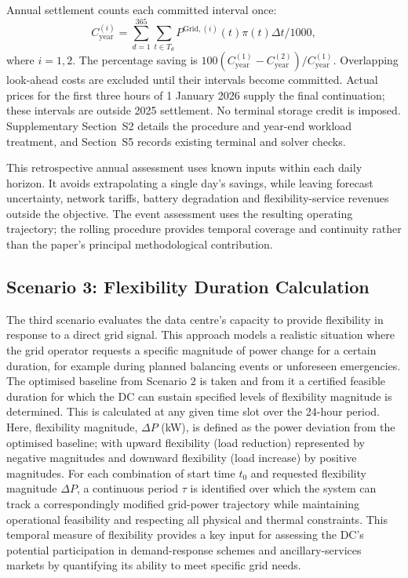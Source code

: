 \documentclass[lettersize,journal]{IEEEtran}
\begin{document}
Annual settlement counts each committed interval once:
\begin{equation}
C^{(i)}_{\mathrm{year}}=\sum_{d=1}^{365}\sum_{t\in T_d}P^{\mathrm{Grid},(i)}(t)\pi(t)\Delta t/1000,
\label{eq:annual-cost}
\end{equation}
where $i=1,2$. The percentage saving is $100(C^{(1)}_{\mathrm{year}}-C^{(2)}_{\mathrm{year}})/C^{(1)}_{\mathrm{year}}$. Overlapping look-ahead costs are excluded until their intervals become committed. Actual prices for the first three hours of 1 January 2026 supply the final continuation; these intervals are outside 2025 settlement. No terminal storage credit is imposed. Supplementary Section~S2 details the procedure and year-end workload treatment, and Section~S5 records existing terminal and solver checks.

This retrospective annual assessment uses known inputs within each daily horizon. It avoids extrapolating a single day's savings, while leaving forecast uncertainty, network tariffs, battery degradation and flexibility-service revenues outside the objective. The event assessment uses the resulting operating trajectory; the rolling procedure provides temporal coverage and continuity rather than the paper's principal methodological contribution.


\subsection{Scenario 3: Flexibility Duration Calculation}\label{sec:scenario 3}
The third scenario evaluates the data centre's capacity to provide flexibility in response to a direct grid signal. This approach models a realistic situation where the grid operator requests a specific magnitude of power change for a certain duration, for example during planned balancing events or unforeseen emergencies. The optimised baseline from Scenario 2 is taken and from it a certified feasible duration for which the DC can sustain specified levels of flexibility magnitude is determined. This is calculated at any given time slot over the 24-hour period. Here, flexibility magnitude, $\Delta P$ (kW), is defined as the power deviation from the optimised baseline; with upward flexibility (load reduction) represented by negative magnitudes and downward flexibility (load increase) by positive magnitudes. For each combination of start time $t_0$ and requested flexibility magnitude $\Delta P$, a continuous period $\tau$ is identified over which the system can track a correspondingly modified grid-power trajectory while maintaining operational feasibility and respecting all physical and thermal constraints. This temporal measure of flexibility provides a key input for assessing the DC's potential participation in demand-response schemes and ancillary-services markets by quantifying its ability to meet specific grid needs.
\end{document}

